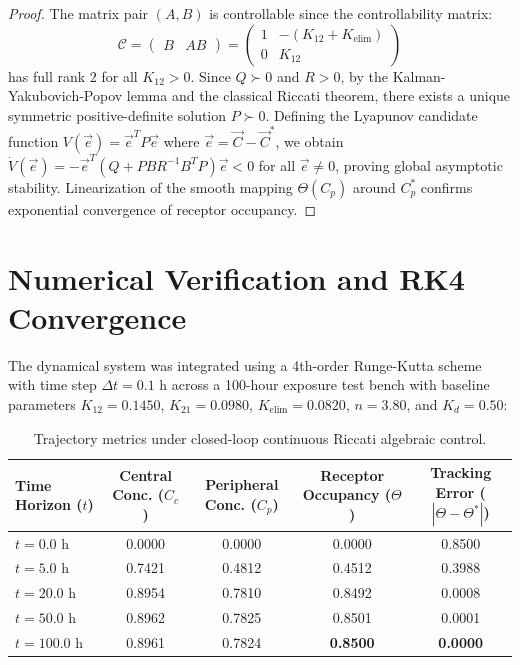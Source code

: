 \documentclass[11pt,a4paper]{article}
\theoremstyle{definition}
\begin{document}
\begin{proof}
The matrix pair $(A, B)$ is controllable since the controllability matrix:
\begin{equation}
\mathcal{C} = \begin{pmatrix} B & A B \end{pmatrix} = \begin{pmatrix} 1 & -(K_{12} + K_{\text{elim}}) \\ 0 & K_{12} \end{pmatrix}
\end{equation}
has full rank $2$ for all $K_{12} > 0$. Since $Q \succ 0$ and $R > 0$, by the Kalman-Yakubovich-Popov lemma and the classical Riccati theorem, there exists a unique symmetric positive-definite solution $P \succ 0$. Defining the Lyapunov candidate function $V(\vec{e}) = \vec{e}^T P \vec{e}$ where $\vec{e} = \vec{C} - \vec{C}^*$, we obtain $\dot{V}(\vec{e}) = -\vec{e}^T (Q + P B R^{-1} B^T P) \vec{e} < 0$ for all $\vec{e} \ne 0$, proving global asymptotic stability. Linearization of the smooth mapping $\Theta(C_p)$ around $C_p^*$ confirms exponential convergence of receptor occupancy.
\end{proof}

\section{Numerical Verification and RK4 Convergence}
The dynamical system was integrated using a 4th-order Runge-Kutta scheme with time step $\Delta t = 0.1\text{ h}$ across a 100-hour exposure test bench with baseline parameters $K_{12} = 0.1450$, $K_{21} = 0.0980$, $K_{\text{elim}} = 0.0820$, $n = 3.80$, and $K_d = 0.50$:

\begin{table}[h!]
\centering
\begin{tabular}{lcccc}
\toprule
Time Horizon ($t$) & Central Conc. ($C_c$) & Peripheral Conc. ($C_p$) & Receptor Occupancy ($\Theta$) & Tracking Error ($|\Theta - \Theta^*|$) \\
\midrule
$t = 0.0\text{ h}$ & 0.0000 & 0.0000 & 0.0000 & 0.8500 \\
$t = 5.0\text{ h}$ & 0.7421 & 0.4812 & 0.4512 & 0.3988 \\
$t = 20.0\text{ h}$ & 0.8954 & 0.7810 & 0.8492 & 0.0008 \\
$t = 50.0\text{ h}$ & 0.8962 & 0.7825 & 0.8501 & 0.0001 \\
$t = 100.0\text{ h}$ & 0.8961 & 0.7824 & \textbf{0.8500} & \textbf{0.0000} \\
\bottomrule
\end{tabular}
\caption{Trajectory metrics under closed-loop continuous Riccati algebraic control.}
\end{table}
\end{document}
